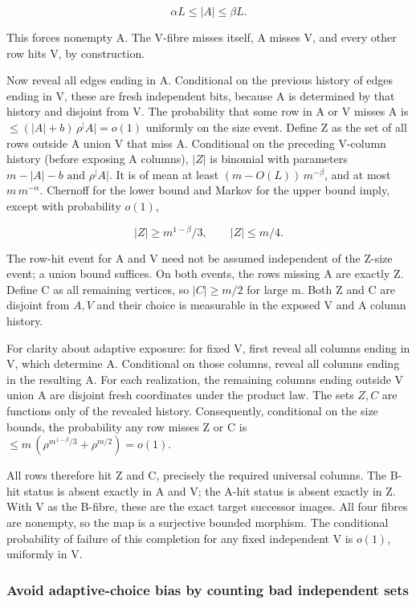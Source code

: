 \documentclass[11pt]{article}
\begin{document}
\[
\alpha L\leq |A|\leq\beta L.
\]

This forces nonempty A. The V-fibre misses itself, A misses V, and every other row hits V, by construction.

Now reveal all edges ending in A. Conditional on the previous history of edges ending in V, these are fresh independent bits, because A is determined by that history and disjoint from V. The probability that some row in A or V misses A is $\leq (|A|+b)\,\rho ^{|}A|=o(1)$ uniformly on the size event. Define Z as the set of all rows outside A union V that miss A. Conditional on the preceding V-column history (before exposing A columns), $|Z|$ is binomial with parameters $m-|A|-b \text{ and } \rho ^{|}A|$. It is of mean at least $(m-O(L))\,m^{-\beta }$, and at most $m\,m^{-\alpha }$. Chernoff for the lower bound and Markov for the upper bound imply, except with probability $o(1)$,

\[
|Z|\geq m^{1-\beta}/3,\qquad |Z|\leq m/4.
\]

The row-hit event for A and V need not be assumed independent of the Z-size event; a union bound suffices. On both events, the rows missing A are exactly Z. Define C as all remaining vertices, so $|C|\geq m/2$ for large m. Both Z and C are disjoint from $A,V$ and their choice is measurable in the exposed V and A column history.

For clarity about adaptive exposure: for fixed V, first reveal all columns ending in V, which determine A. Conditional on those columns, reveal all columns ending in the resulting A. For each realization, the remaining columns ending outside V union A are disjoint fresh coordinates under the product law. The sets $Z,C$ are functions only of the revealed history. Consequently, conditional on the size bounds, the probability any row misses Z or C is $\leq m\,(\rho ^{m^{1-\beta }/3}+\rho ^{m/2})=o(1)$.

All rows therefore hit Z and C, precisely the required universal columns. The B-hit status is absent exactly in A and V; the A-hit status is absent exactly in Z. With V as the B-fibre, these are the exact target successor images. All four fibres are nonempty, so the map is a surjective bounded morphism. The conditional probability of failure of this completion for any fixed independent V is $o(1)$, uniformly in V.

\subsubsection{Avoid adaptive-choice bias by counting bad independent sets}
\end{document}
